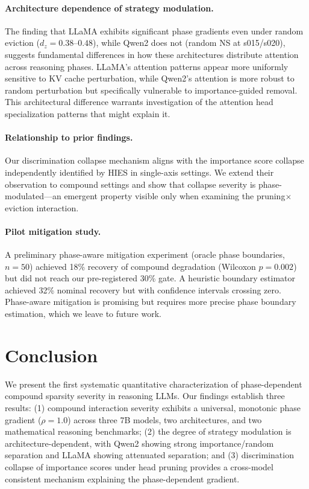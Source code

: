 \documentclass[11pt,a4paper]{article}
\begin{document}
\paragraph{Architecture dependence of strategy modulation.} The finding that LLaMA exhibits significant phase gradients even under random eviction ($d_z = 0.38$--$0.48$), while Qwen2 does not (random NS at s015/s020), suggests fundamental differences in how these architectures distribute attention across reasoning phases. LLaMA's attention patterns appear more uniformly sensitive to KV cache perturbation, while Qwen2's attention is more robust to random perturbation but specifically vulnerable to importance-guided removal. This architectural difference warrants investigation of the attention head specialization patterns that might explain it.

\paragraph{Relationship to prior findings.} Our discrimination collapse mechanism aligns with the importance score collapse independently identified by HIES \cite{hies2025} in single-axis settings. We extend their observation to compound settings and show that collapse severity is phase-modulated---an emergent property visible only when examining the pruning$\times$eviction interaction.

\paragraph{Pilot mitigation study.} A preliminary phase-aware mitigation experiment (oracle phase boundaries, $n = 50$) achieved 18\% recovery of compound degradation (Wilcoxon $p = 0.002$) but did not reach our pre-registered 30\% gate. A heuristic boundary estimator achieved 32\% nominal recovery but with confidence intervals crossing zero. Phase-aware mitigation is promising but requires more precise phase boundary estimation, which we leave to future work.

\section{Conclusion}

We present the first systematic quantitative characterization of phase-dependent compound sparsity severity in reasoning LLMs. Our findings establish three results: (1) compound interaction severity exhibits a universal, monotonic phase gradient ($\rho = 1.0$) across three 7B models, two architectures, and two mathematical reasoning benchmarks; (2) the degree of strategy modulation is architecture-dependent, with Qwen2 showing strong importance/random separation and LLaMA showing attenuated separation; and (3) discrimination collapse of importance scores under head pruning provides a cross-model consistent mechanism explaining the phase-dependent gradient.
\end{document}
